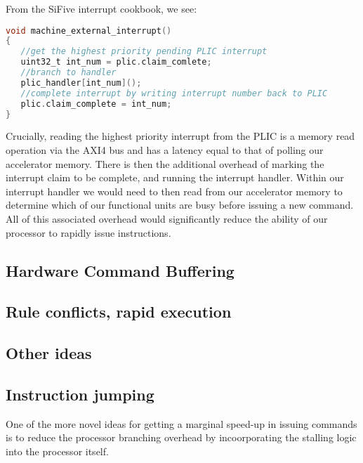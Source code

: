 \documentclass[a4paper,8pt]{report}
\begin{document}
From the SiFive interrupt cookbook, we see:
\begin{lstlisting}[language=C,style=customc]
void machine_external_interrupt()
{
   //get the highest priority pending PLIC interrupt
   uint32_t int_num = plic.claim_comlete;
   //branch to handler
   plic_handler[int_num]();
   //complete interrupt by writing interrupt number back to PLIC
   plic.claim_complete = int_num;
}
\end{lstlisting}

Crucially, reading the highest priority interrupt from the PLIC is a memory
read operation via the AXI4 bus and has a latency equal to that of polling our
accelerator memory. There is then the additional overhead of marking the
interrupt claim to be complete, and running the interrupt handler. Within our
interrupt handler we would need to then read from our accelerator memory to
determine which of our functional units are busy before issuing a new command.
All of this associated overhead would significantly reduce the ability of our
processor to rapidly issue instructions.

\subsection{Hardware Command Buffering}

\subsection{Rule conflicts, rapid execution}



\subsection{Other ideas}



\subsection{Instruction jumping}
One of the more novel ideas for getting a marginal speed-up in issuing commands
is to reduce the processor branching overhead by incoorporating the stalling
logic into the processor itself.
\end{document}
